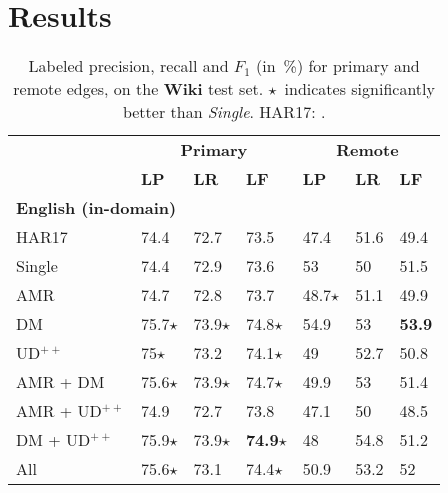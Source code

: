 \documentclass[11pt,a4paper]{article}
\begin{document}
\section{Results}\label{sec:results}


\begin{table}[t]
\centering
\small
\setlength\tabcolsep{3pt}
\begin{tabular}{l|lll|lll}
& \multicolumn{3}{c|}{\footnotesize \bf Primary} & \multicolumn{3}{c}{\footnotesize \bf Remote} \\
& \footnotesize \textbf{LP} & \footnotesize \textbf{LR} & \footnotesize \textbf{LF}
& \footnotesize \textbf{LP} & \footnotesize \textbf{LR} & \footnotesize \textbf{LF} \\
\hline
\multicolumn{4}{l|}{\small \bf English (in-domain)} & \\
\footnotesize HAR17
& 74.4 & 72.7 & 73.5 & 47.4 & 51.6 & 49.4 \\
\footnotesize Single
& 74.4 & 72.9 & 73.6 & 53 & 50 & 51.5 \\
\cline{1-1}
\footnotesize AMR
& 74.7 & 72.8 & 73.7 & 48.7$\star$ & 51.1 & 49.9 \\
\footnotesize DM
& 75.7$\star$ & 73.9$\star$ & 74.8$\star$ & 54.9 & 53 & \textbf{53.9} \\
\footnotesize UD$^{++}$
& 75$\star$ & 73.2 & 74.1$\star$ & 49 & 52.7 & 50.8 \\
\footnotesize AMR + DM
& 75.6$\star$ & 73.9$\star$ & 74.7$\star$ & 49.9 & 53 & 51.4 \\
\footnotesize AMR + UD$^{++}$
& 74.9 & 72.7 & 73.8 & 47.1 & 50 & 48.5 \\
\footnotesize DM + UD$^{++}$
& 75.9$\star$ & 73.9$\star$ & \textbf{74.9}$\star$ & 48 & 54.8 & 51.2 \\
\footnotesize All
& 75.6$\star$ & 73.1 & 74.4$\star$ & 50.9 & 53.2 & 52
\end{tabular}
\caption{
Labeled precision, recall and $F_1$ (in~\%) for primary and remote edges,
on the \textbf{Wiki} test set.
$\star$~indicates significantly better than \textit{Single}.
HAR17: \citet{hershcovich2017a}.}\label{tab:id_results}
\end{table}
\end{document}
